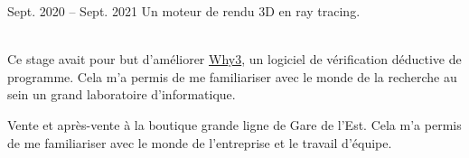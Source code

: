 \documentclass[10pt,a4paper,ragged2e,withhyper]{altacv}
\begin{document}
\begin{paracol}{2}
            {Sept. 2020 -- Sept. 2021}{}
            Un moteur de rendu 3D en ray tracing.\\
            \vspace{4pt}
            \\
            \vspace{4pt}

            Ce stage avait pour but d'améliorer \href{http://why3.lri.fr/}{Why3}, un logiciel de vérification déductive de programme.
            Cela m'a permis de me familiariser avec le monde de la recherche au sein un grand laboratoire d'informatique.\\

            \divider

            Vente et après-vente à la boutique grande ligne de Gare de l'Est. Cela m'a permis de me familiariser avec le monde de l'entreprise et le travail d'équipe.

    \end{paracol}
\end{document}
